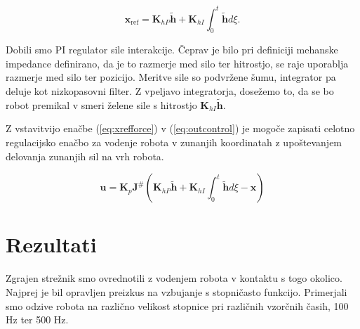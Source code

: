 \documentclass[a4paper]{article}
\begin{document}
\begin{equation} \label{eq:xrefforce}
\textbf{x}_{\mathrm{ref}} = \textbf{K}_{hP}\tilde{\textbf{h}} + \textbf{K}_{hI} \int_{0}^{t}\tilde{\textbf{h}}d\xi.
\end{equation}

Dobili smo PI regulator sile interakcije. Čeprav je bilo pri definiciji mehanske impedance definirano, da je to razmerje med silo ter hitrostjo, se raje uporablja razmerje med silo ter pozicijo. Meritve sile so podvržene šumu, integrator pa deluje kot nizkopasovni filter. Z vpeljavo integratorja, dosežemo to, da se bo robot premikal v smeri želene sile s hitrostjo $\textbf{K}_{hI} \tilde{\textbf{h}}$.

Z vstavitvijo enačbe (\ref{eq:xrefforce}) v (\ref{eq:outcontrol}) je mogoče zapisati celotno regulacijsko enačbo za vodenje robota v zunanjih koordinatah z upoštevanjem delovanja zunanjih sil na vrh robota.

\begin{equation} \label{eq:admitcontrol}
\textbf{u} = \textbf{K}_p  \textbf{J}^{\#}(\textbf{K}_{hP}\tilde{\textbf{h}} + \textbf{K}_{hI} \int_{0}^{t}\tilde{\textbf{h}}d\xi - \textbf{x})
\end{equation}


\section{Rezultati}

Zgrajen strežnik smo ovrednotili z vodenjem robota v kontaktu s togo okolico. Najprej je bil opravljen preizkus na vzbujanje s stopničasto funkcijo. Primerjali smo odzive robota na različno velikost stopnice pri različnih vzorčnih časih, 100 Hz ter 500 Hz.
\end{document}
